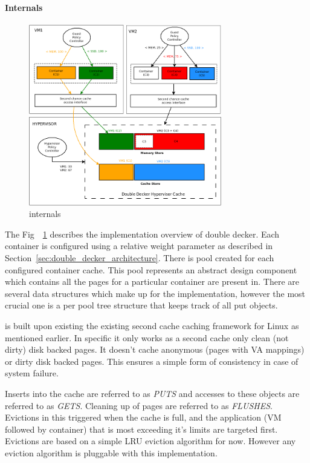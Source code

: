     \paragraph{Internals}
    \label{sec:double_decker_internals}
    
      \begin{figure}
	\centering
	\includegraphics[width=0.75\textwidth]{images/background/single_level_implementation.png}
	\caption{\dd{} internals}
	\label{img:doube_decker_internals}
      \end{figure}
	  
	The Fig~~\ref{img:doube_decker_internals} describes the \tmem{} implementation overview of double decker. Each container is configured using a
	relative weight parameter as described in Section~\ref{sec:double_decker_architecture}. There is pool created for each configured container cache. This
	pool represents an abstract design component which contains all the pages for a particular container are present in. 
	There are several data structures which make up  for the \tmem implementation, however the most crucial one is a per pool tree structure that keeps 
	track of all put objects.
	
	\dd{} is built upon existing the existing \tmem{} second cache caching framework for Linux as mentioned earlier. In specific it only works as a second
	cache only clean (not dirty) disk backed pages. It doesn't cache anonymous (pages with VA mappings) or dirty disk backed pages. This ensures a simple 
	form of consistency in case of system failure. 
	
	Inserts into the cache are referred to as \textit{PUTS} and accesses to these objects are referred to as \textit{GETS}. Cleaning up of pages are referred
	to as \textit{FLUSHES}. Evictions in this triggered when the cache is full, and the application (VM followed by container) that is most exceeding it's 
	limits are targeted first. Evictions are based on a simple LRU eviction algorithm for now. However any eviction algorithm is pluggable with this implementation.
  
    
  
      

      